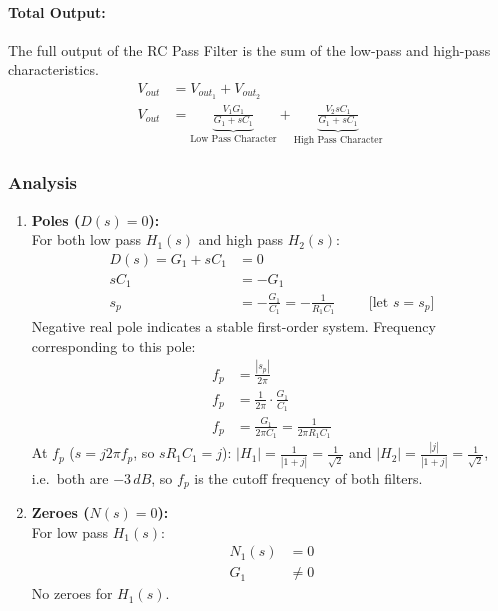 \paragraph{Total Output:}
The full output of the RC Pass Filter is the sum of the
low-pass and high-pass characteristics.
\begin{align*}
  V_{out} &= V_{out_1} + V_{out_2} \\
  V_{out} &= \underbrace{\frac{V_{1}G_1}{G_1 + sC_1}}_{\text{Low Pass Character}} + \underbrace{\frac{V_{2}sC_1}{G_1 + sC_1}}_{\text{High Pass Character}}
\end{align*}

\subsubsection{Analysis}
\begin{enumerate}
  \item \textbf{Poles (\(D(s) = 0\)):} \\
    For both low pass \(H_1(s)\) and high pass \(H_2(s)\):
      \begin{align*}
        D(s) = G_1 + sC_1 &= 0 \\
        sC_1 &= -G_1 \\
        s_p &= -\frac{G_1}{C_1} = -\frac{1}{R_1 C_1} \hspace{1cm} \text{[let \(s = s_p\)]}
      \end{align*}
    Negative real pole indicates a stable first-order system.
    Frequency corresponding to this pole:
    \begin{align*}
      f_p &= \frac{|s_p|}{2\pi} \\
      f_p &= \frac{1}{2\pi}\cdot\frac{G_1}{C_1} \\
      f_p &= \frac{G_1}{2 \pi C_1} = \frac{1}{2 \pi R_1 C_1}
    \end{align*}
    At \(f_p\) (\(s = j 2\pi f_p\), so \(sR_1C_1 = j\)):
    \(|H_1| = \frac{1}{|1 + j|} = \frac{1}{\sqrt{2}}\) and
    \(|H_2| = \frac{|j|}{|1 + j|} = \frac{1}{\sqrt{2}}\), i.e.\ both are
    \(-3\,dB\), so \(f_p\) is the cutoff frequency of both filters.
  \item \textbf{Zeroes (\(N(s) = 0\)):} \\
    For low pass $H_1(s)$:
      \begin{align*}
        N_1(s) &= 0 \\
        G_1 &\neq 0
      \end{align*}
    No zeroes for \(H_1(s)\). \\

\end{enumerate}
